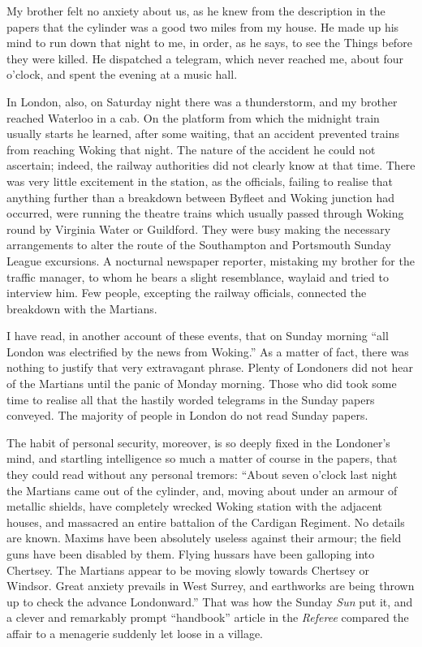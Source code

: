 My brother felt no anxiety about us, as he knew from the
description in the papers that the cylinder was a good two miles
from my house. He made up his mind to run down that night to me, in
order, as he says, to see the Things before they were killed. He
dispatched a telegram, which never reached me, about four o'clock,
and spent the evening at a music hall.

In London, also, on Saturday night there was a thunderstorm, and my
brother reached Waterloo in a cab. On the platform from which the
midnight train usually starts he learned, after some waiting, that
an accident prevented trains from reaching Woking that night. The
nature of the accident he could not ascertain; indeed, the railway
authorities did not clearly know at that time. There was very
little excitement in the station, as the officials, failing to
realise that anything further than a breakdown between Byfleet and
Woking junction had occurred, were running the theatre trains which
usually passed through Woking round by Virginia Water or Guildford.
They were busy making the necessary arrangements to alter the route
of the Southampton and Portsmouth Sunday League excursions. A
nocturnal newspaper reporter, mistaking my brother for the traffic
manager, to whom he bears a slight resemblance, waylaid and tried
to interview him. Few people, excepting the railway officials,
connected the breakdown with the Martians.

I have read, in another account of these events, that on Sunday
morning ``all London was electrified by the news from Woking.'' As a
matter of fact, there was nothing to justify that very extravagant
phrase. Plenty of Londoners did not hear of the Martians until the
panic of Monday morning. Those who did took some time to realise
all that the hastily worded telegrams in the Sunday papers
conveyed. The majority of people in London do not read Sunday
papers.

The habit of personal security, moreover, is so deeply fixed in the
Londoner's mind, and startling intelligence so much a matter of
course in the papers, that they could read without any personal
tremors: ``About seven o'clock last night the Martians came out of
the cylinder, and, moving about under an armour of metallic
shields, have completely wrecked Woking station with the adjacent
houses, and massacred an entire battalion of the Cardigan Regiment.
No details are known. Maxims have been absolutely useless against
their armour; the field guns have been disabled by them. Flying
hussars have been galloping into Chertsey. The Martians appear to
be moving slowly towards Chertsey or Windsor. Great anxiety
prevails in West Surrey, and earthworks are being thrown up to
check the advance Londonward.'' That was how the Sunday \emph{Sun}
put it, and a clever and remarkably prompt ``handbook'' article in
the \emph{Referee} compared the affair to a menagerie suddenly let
loose in a village.

